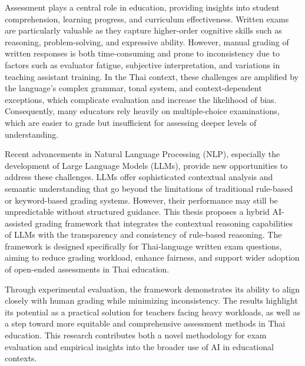 %

Assessment plays a central role in education, providing insights into 
student comprehension, learning progress, and curriculum effectiveness. 
Written exams are particularly valuable as they capture higher-order 
cognitive skills such as reasoning, problem-solving, and expressive 
ability. However, manual grading of written responses is both 
time-consuming and prone to inconsistency due to factors such as 
evaluator fatigue, subjective interpretation, and variations in 
teaching assistant training. In the Thai context, these challenges are 
amplified by the language’s complex grammar, tonal system, and 
context-dependent exceptions, which complicate evaluation and increase 
the likelihood of bias. Consequently, many educators rely heavily on 
multiple-choice examinations, which are easier to grade but 
insufficient for assessing deeper levels of understanding.

Recent advancements in Natural Language Processing (NLP), especially 
the development of Large Language Models (LLMs), provide new 
opportunities to address these challenges. LLMs offer sophisticated 
contextual analysis and semantic understanding that go beyond the 
limitations of traditional rule-based or keyword-based grading systems. 
However, their performance may still be unpredictable without 
structured guidance. This thesis proposes a hybrid AI-assisted grading 
framework that integrates the contextual reasoning capabilities of LLMs 
with the transparency and consistency of rule-based reasoning. The 
framework is designed specifically for Thai-language written exam 
questions, aiming to reduce grading workload, enhance fairness, and 
support wider adoption of open-ended assessments in Thai education.

Through experimental evaluation, the framework demonstrates its ability 
to align closely with human grading while minimizing inconsistency. 
The results highlight its potential as a practical solution for 
teachers facing heavy workloads, as well as a step toward more 
equitable and comprehensive assessment methods in Thai education. 
This research contributes both a novel methodology for exam evaluation 
and empirical insights into the broader use of AI in educational 
contexts.
\\\\


